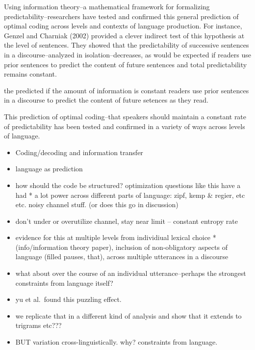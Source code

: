 \documentclass[man,floatsintext]{apa6}
\providecommand{\tightlist}{%
  \setlength{\itemsep}{0pt}\setlength{\parskip}{0pt}}
\begin{document}
Using information theory--a mathematical framework for formalizing predictability--researchers have tested and confirmed this general prediction of optimal coding across levels and contexts of language production. For instance, Genzel and Charniak (2002) provided a clever indirect test of this hypothesis at the level of sentences. They showed that the predictability of successive sentences in a discourse--analyzed in isolation--decreases, as would be expected if readers use prior sentences to predict the content of future sentences and total predictability remains constant.

the predicted if the amount of information is constant readers use prior sentences in a discourse to predict the content of future setences as they read.

This prediction of optimal coding--that speakers should maintain a constant rate of predictability has been tested and confirmed in a variety of ways across levels of language.

\begin{itemize}
\tightlist
\item
  Coding/decoding and information transfer
\item
  language as prediction
\item
  how should the code be structured? optimization questions like this have a had * a lot power across different parts of language: zipf, kemp \& regier, etc etc. noisy channel stuff. (or does this go in discussion)
\item
  don't under or overutilize channel, stay near limit -- constant entropy rate
\item
  evidence for this at multiple levels from individiual lexical choice *(info/information theory paper), inclusion of non-obligatory aspects of language (filled pauses, that), across multiple utterances in a discourse
\item
  what about over the course of an individual utterance--perhaps the strongest constraints from language itself?
\item
  yu et al.~found this puzzling effect.
\item
  we replicate that in a different kind of analysis and show that it extends to trigrams etc???
\item
  BUT variation cross-linguistically. why? constraints from language.
\end{itemize}
\end{document}
